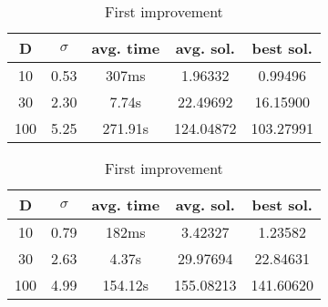 \documentclass{article}
\begin{document}
\begin{table}[htbp]
\begin{minipage}{.4\linewidth}
    \centering
    
    \begin{tabular}{|c|c|c|c|c|}
    \hline
    D   & $\sigma$  & avg. time     & avg. sol.     & best sol.\\
    \hline
    10  & 0.53      & 307ms         & 1.96332       & 0.99496 \\
    \hline
    30  & 2.30      & 7.74s         & 22.49692      & 16.15900 \\
    \hline
    100 & 5.25      & 271.91s       & 124.04872     & 103.27991 \\
    \hline
    \end{tabular}
    \caption{Best improvement}
  \end{minipage}%
  \quad %
  \begin{minipage}{.75\linewidth}
    \centering
    
    \begin{tabular}{|c|c|c|c|c|}
    \hline
    D   & $\sigma$  & avg. time     & avg. sol.     & best sol. \\
    \hline
    10  & 0.79      & 182ms         & 3.42327       & 1.23582 \\
    \hline
    30  & 2.63      & 4.37s         & 29.97694      & 22.84631 \\
    \hline
    100 & 4.99      & 154.12s       & 155.08213     & 141.60620 \\
    \hline
    \end{tabular}
    \caption{First improvement}
  \end{minipage}
\end{table}
\end{document}

